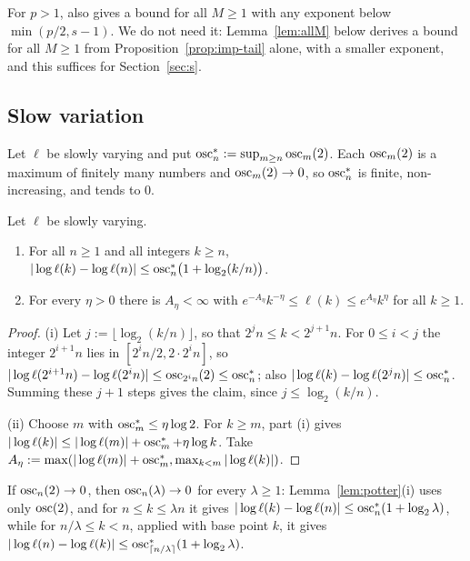For $p>1$, \tailbound{} also gives a bound for all $M\ge1$ with any exponent below $\min(p/2,s-1)$. We do not need it:
Lemma~\ref{lem:allM} below derives a bound for all $M\ge1$ from Proposition~\ref{prop:imp-tail} alone, with a smaller
exponent, and this suffices for Section~\ref{sec:s}.

\subsection{Slow variation}\label{sec:prelim-sv}
Let $\ell$ be slowly varying and put $\operatorname{osc}^*_n:=\sup_{m\ge n}\operatorname{osc}_m(2)$. Each $\operatorname{osc}_m(2)$ is a maximum of finitely
many numbers and $\operatorname{osc}_m(2)\to0$, so $\operatorname{osc}^*_n$ is finite, non-increasing, and tends to $0$.

\begin{lemma}\label{lem:potter}
Let $\ell$ be slowly varying.
\begin{enumerate}
\item[\textup{(i)}] For all $n\ge1$ and all integers $k\ge n$,
  $|\log\ell(k)-\log\ell(n)|\le\operatorname{osc}^*_n\bigl(1+\log_2(k/n)\bigr)$.
\item[\textup{(ii)}] For every $\eta>0$ there is $A_\eta<\infty$ with $e^{-A_\eta}k^{-\eta}\le\ell(k)\le
  e^{A_\eta}k^{\eta}$ for all $k\ge1$.
\end{enumerate}
\end{lemma}

\begin{proof}
(i) Let $j:=\lfloor\log_2(k/n)\rfloor$, so that $2^jn\le k<2^{j+1}n$. For $0\le i<j$ the integer $2^{i+1}n$ lies in
$[2^in/2,2\cdot2^in]$, so $|\log\ell(2^{i+1}n)-\log\ell(2^in)|\le\operatorname{osc}_{2^in}(2)\le\operatorname{osc}^*_n$; also
$|\log\ell(k)-\log\ell(2^jn)|\le\operatorname{osc}^*_n$. Summing these $j+1$ steps gives the claim, since $j\le\log_2(k/n)$.

(ii) Choose $m$ with $\operatorname{osc}^*_m\le\eta\log2$. For $k\ge m$, part (i) gives $|\log\ell(k)|\le|\log\ell(m)|+\operatorname{osc}^*_m+
\eta\log k$. Take $A_\eta:=\max(|\log\ell(m)|+\operatorname{osc}^*_m,\max_{k<m}|\log\ell(k)|)$.
\end{proof}

\begin{remark}\label{rem:lambda2}
If $\operatorname{osc}_n(2)\to0$, then $\operatorname{osc}_n(\lambda)\to0$ for every $\lambda\ge1$: Lemma~\ref{lem:potter}(i) uses only
$\operatorname{osc}(2)$, and for $n\le k\le\lambda n$ it gives $|\log\ell(k)-\log\ell(n)|\le\operatorname{osc}^*_n(1+\log_2\lambda)$, while for
$n/\lambda\le k<n$, applied with base point $k$, it gives $|\log\ell(n)-\log\ell(k)|\le\operatorname{osc}^*_{\lceil
n/\lambda\rceil}(1+\log_2\lambda)$.
\end{remark}

